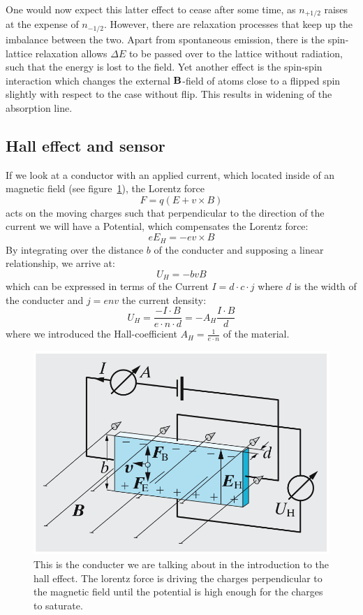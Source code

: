One would now expect this latter effect to cease after some time, as $n_{+1/2}$ raises at the expense of 
$n_{-1/2}$. However, there are relaxation processes that keep up the imbalance between the two. 
Apart from spontaneous emission, there is the spin-lattice relaxation allows $\Delta E$ to be passed 
over to the lattice without radiation, such that the energy is lost to the field. 
Yet another effect is the spin-spin interaction which changes the external $\mathbf{B}$-field of atoms close 
to a flipped spin slightly with respect to the case without flip. This results in widening of the 
absorption line. 

\subsection{Hall effect and sensor}
If we look at a conductor with an applied current, which located inside of an magnetic field
(see figure~\ref{fig:halleffect}), the Lorentz force
\begin{equation}
    F = q ( E + v \times B)
\end{equation}
acts on the moving charges such that perpendicular to the direction of the current we will have a Potential,
which compensates the Lorentz force:
\begin{equation}
    e E_H = -e v \times B
\end{equation}
By integrating over the distance $b$ of the conducter and supposing a linear
relationship, we arrive at:
\begin{equation}
    U_H = - b v B
\end{equation}
which can be expressed in terms of the Current $I = d \cdot c \cdot j$ where $d$ is the width of the 
conducter and $j=e n v$ the current density:
\begin{equation}
    U_H = \frac{- I\cdot B}{e\cdot n\cdot d}  = -A_H \frac{I\cdot B}{d}
\end{equation}
where we introduced the Hall-coefficient $A_H =\frac{1}{e\cdot n}$ of the material.
\begin{figure}[htpb]
    \centering
    \includegraphics[width=0.8\linewidth]{figures/halleffect}
    \caption{This is the conducter we are talking about in the introduction \cite{gerthsen} to the hall effect.
    The lorentz force is driving the charges perpendicular to the magnetic field until the potential is 
    high enough for the charges to saturate.}
    \label{fig:halleffect}
\end{figure}






